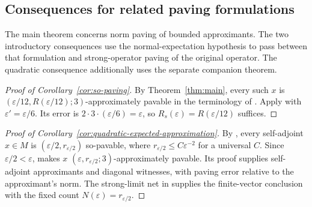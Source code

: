 \subsection{Consequences for related paving formulations}
\label{gen:consequences}

The main theorem concerns norm paving of bounded approximants. The two
introductory consequences use the normal-expectation hypothesis to pass
between that formulation and strong-operator paving of the original
operator. The quadratic consequence additionally uses the separate
companion theorem.

\begin{proof}[Proof of Corollary~\ref{cor:so-paving}]
By Theorem~\ref{thm:main}, every such \(x\) is
\((\varepsilon/12,R(\varepsilon/12);3)\)-approximately pavable
in the terminology of \cite[Definition~2.3]{PV15}.
Apply \cite[Proposition~2.4(1)]{PV15} with
\(\varepsilon'=\varepsilon/6\).
Its error is \(2\cdot3\cdot(\varepsilon/6)=\varepsilon\), so
\(R_s(\varepsilon)=R(\varepsilon/12)\) suffices.
\end{proof}

\begin{proof}[Proof of Corollary~\ref{cor:quadratic-expected-approximation}]
By \cite[Theorem~1.1]{OAQuadratic26}, every self-adjoint \(x\in M\)
is \((\varepsilon/2,r_{\varepsilon/2})\) so-pavable, where
\(r_{\varepsilon/2}\leq C\varepsilon^{-2}\) for a universal \(C\).
Since \(\varepsilon/2<\varepsilon\),
\cite[Proposition~2.4(2)]{PV15} makes \(x\)
\((\varepsilon,r_{\varepsilon/2};3)\)-approximately pavable.
Its proof supplies self-adjoint approximants and diagonal witnesses,
with paving error relative to the approximant's norm.
The strong-limit net in \cite[Definition~2.3]{PV15} supplies the
finite-vector conclusion with the fixed count
\(N(\varepsilon)=r_{\varepsilon/2}\).
\end{proof}
